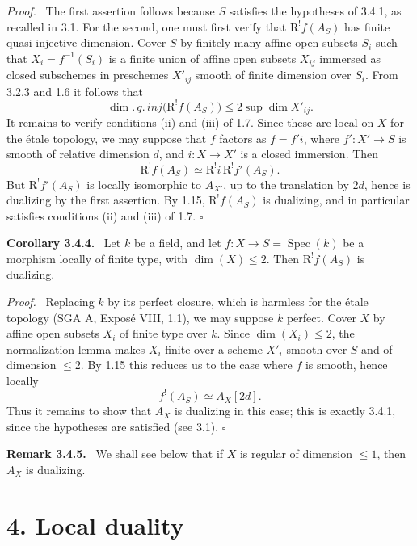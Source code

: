 \documentclass[11pt]{article}
\theoremstyle{plain}
\theoremstyle{definition}
\theoremstyle{remark}
\newenvironment{statement}[1]{\par\medskip\noindent\textbf{#1.}\ }{\par\medskip}
\newenvironment{prooftext}{\par\noindent\textit{Proof.}\ }{\par\medskip}
\DeclareMathOperator{\Spec}{Spec}
\newcommand{\R}{\mathrm R}
\newcommand{\qedtext}{\hfill$\square$}
\begin{document}
\begin{prooftext}
The first assertion follows because $S$ satisfies the hypotheses of 3.4.1, as recalled in 3.1. For the second, one must first verify that $\R^!f(A_S)$ has finite quasi-injective dimension. Cover $S$ by finitely many affine open subsets $S_i$ such that $X_i=f^{-1}(S_i)$ is a finite union of affine open subsets $X_{ij}$ immersed as closed subschemes in preschemes $X'_{ij}$ smooth of finite dimension over $S_i$. From 3.2.3 and 1.6 it follows that
\[
   \dim.\,q.\,inj\bigl(\R^!f(A_S)\bigr)
       \le 2\sup \dim X'_{ij}.
\]
It remains to verify conditions (ii) and (iii) of 1.7. Since these are local on $X$ for the étale topology, we may suppose that $f$ factors as $f=f'i$, where $f':X'\to S$ is smooth of relative dimension $d$, and $i:X\to X'$ is a closed immersion. Then
\[
   \R^!f(A_S)\simeq \R^!i\,\R^!f'(A_S).
\]
But $\R^!f'(A_S)$ is locally isomorphic to $A_{X'}$, up to the translation by $2d$, hence is dualizing by the first assertion. By 1.15, $\R^!f(A_S)$ is dualizing, and in particular satisfies conditions (ii) and (iii) of 1.7. \qedtext
\end{prooftext}

\begin{statement}{Corollary 3.4.4}
Let $k$ be a field, and let $f:X\to S=\Spec(k)$ be a morphism locally of finite type, with $\dim(X)\le2$. Then $\R^!f(A_S)$ is dualizing.
\end{statement}

\begin{prooftext}
Replacing $k$ by its perfect closure, which is harmless for the étale topology (SGA A, Exposé VIII, 1.1), we may suppose $k$ perfect. Cover $X$ by affine open subsets $X_i$ of finite type over $k$. Since $\dim(X_i)\le2$, the normalization lemma makes $X_i$ finite over a scheme $X'_i$ smooth over $S$ and of dimension $\le2$. By 1.15 this reduces us to the case where $f$ is smooth, hence locally
\[
   f^!(A_S)\simeq A_X[2d].
\]
Thus it remains to show that $A_X$ is dualizing in this case; this is exactly 3.4.1, since the hypotheses are satisfied (see 3.1). \qedtext
\end{prooftext}

\begin{statement}{Remark 3.4.5}
We shall see below that if $X$ is regular of dimension $\le1$, then $A_X$ is dualizing.
\end{statement}

\section*{4. Local duality}
\end{document}
